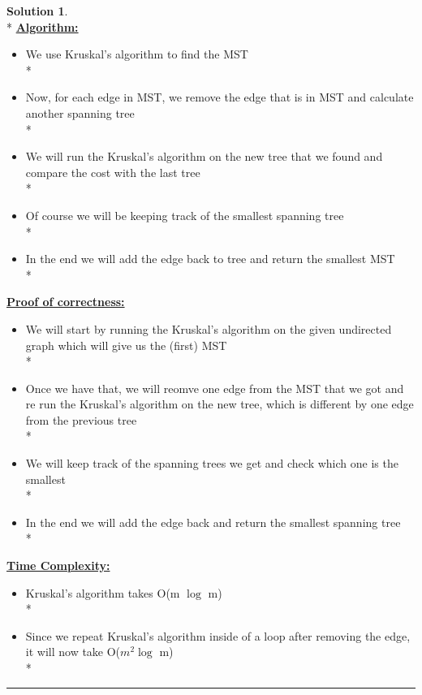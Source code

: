\documentclass{article}
\theoremstyle{definition}
\def\fline{\rule{0.75\linewidth}{0.5pt}}
\newcommand{\finishline}{\vspace{-15pt}\begin{center}\fline\end{center}}
\newtheorem*{solution*}{Solution}
\newenvironment{solution}{\begin{solution*}}{{\finishline} \end{solution*}}
\begin{document}
\begin{solution}
\hfill \bigskip\\*
	\textbf{\underline{Algorithm:}}
		\begin{itemize}
			\item We use Kruskal's algorithm to find the MST \\*
			\item Now, for each edge in MST, we remove the edge that is in MST and calculate another spanning tree \\*
			\item We will run the Kruskal's algorithm on the new tree that we found and compare the cost with the last tree \\*
			\item Of course we will be keeping track of the smallest spanning tree \\*
			\item In the end we will add the edge back to tree and return the smallest MST \\*
		\end{itemize} 		
	\textbf{\underline{Proof of correctness:}} 	
		\begin{itemize}
			\item We will start by running the Kruskal's algorithm on the given undirected graph which will give us the (first) MST \\*
			\item  Once we have that, we will reomve one edge from the MST that we got and re run the Kruskal's algorithm on the new tree, which is different by one edge from the previous tree\\*
			\item We will keep track of the spanning trees we get and check which one is the smallest \\*
			\item  In the end we will add the edge back and return the smallest spanning tree\\*
		\end{itemize} 
	\textbf{\underline{Time Complexity:}} 
		\begin{itemize}
			\item Kruskal's algorithm takes O(m $\log$ m) \\*
			\item Since we repeat Kruskal's algorithm inside of a loop after removing the edge, it will now take O($m^{2} \log$ m) \\*
		\end{itemize} 
\end{solution}
\end{document}
